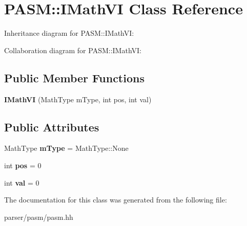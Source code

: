 \hypertarget{classPASM_1_1IMathVI}{}\section{P\+A\+SM\+:\+:I\+Math\+VI Class Reference}
\label{classPASM_1_1IMathVI}


Inheritance diagram for P\+A\+SM\+:\+:I\+Math\+VI\+:


Collaboration diagram for P\+A\+SM\+:\+:I\+Math\+VI\+:
\subsection*{Public Member Functions}
\begin{DoxyCompactItemize}
\item 
\mbox{\label{classPASM_1_1IMathVI_abdb032f904c33ec557583e56382fb518}} 
{\bfseries I\+Math\+VI} (Math\+Type m\+Type, int pos, int val)
\end{DoxyCompactItemize}
\subsection*{Public Attributes}
\begin{DoxyCompactItemize}
\item 
\mbox{\label{classPASM_1_1IMathVI_afa4e53a7f80fd5ece761d74b7b60140c}} 
Math\+Type {\bfseries m\+Type} = Math\+Type\+::\+None
\item 
\mbox{\label{classPASM_1_1IMathVI_acc851ec2e8494a9bb3a8a6fc18aafde5}} 
int {\bfseries pos} = 0
\item 
\mbox{\label{classPASM_1_1IMathVI_a50ef14232a7b8ff79ab4066df776566b}} 
int {\bfseries val} = 0
\end{DoxyCompactItemize}


The documentation for this class was generated from the following file\+:\begin{DoxyCompactItemize}
\item 
parser/pasm/pasm.\+hh\end{DoxyCompactItemize}

